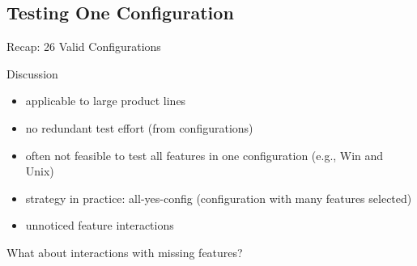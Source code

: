 \subsection{Testing One Configuration}
\begin{frame}{\myframetitle}
	\begin{mycolumns}[b]
		\centering\featureDiagramConfigurableDatabase
		
		\begin{example}{Recap: 26 Valid Configurations \lecturemodeling}
			\footnotesize
		\end{example}
	\mynextcolumn
		\pause\vspace{-10mm}
		\begin{note}{Discussion}
			\begin{itemize}
				\setlength\itemsep{.4em}
				\item applicable to large product lines
				\item no redundant test effort (from configurations)
				\item often not feasible to test all features in one configuration (e.g., Win and Unix)
				\item strategy in practice: all-yes-config (configuration with many features selected)
				\item unnoticed feature interactions \lectureinteractions
			\end{itemize}
		\end{note}
		\pause
		\begin{example}{What about interactions with missing features?}
			\centering{}
		\end{example}
	\end{mycolumns}
\end{frame}

